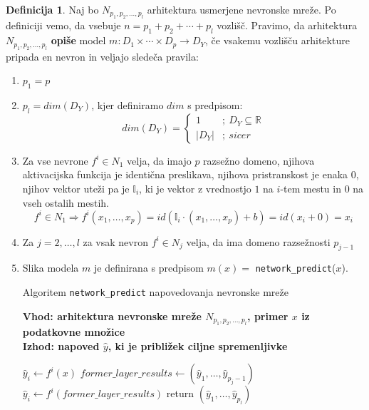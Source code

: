 \documentclass[12pt,a4paper,twoside]{article}
\theoremstyle{definition} %
\newtheorem{definicija}{Definicija}[section]
\theoremstyle{plain} %
\numberwithin{equation}{section}  %
\begin{document}
\begin{definicija}

Naj bo $N_{p_1,p_2,\ldots,p_l}$ arhitektura usmerjene nevronske mreže. Po definiciji vemo, da vsebuje $n= p_1+p_2+\cdots+p_l$ vozlišč. Pravimo, da arhitektura $N_{p_1,p_2,\ldots,p_l}$ \textbf{opiše} model $m: D_1 \times \cdots \times D_p \rightarrow D_Y$, če vsakemu vozlišču arhitekture pripada en nevron in veljajo sledeča pravila:

\begin{enumerate}
  \item $ p_1 = p$

  \item $p_l = dim(D_Y)$, kjer definiramo $dim$ s predpisom:
  \[
	  dim(D_Y) =
	  \begin{cases}
		1 &;\ D_Y \subseteq \mathbb{R} \\
		|D_Y| &;\ sicer
	  \end{cases}	
  \]%

  \item Za vse nevrone $f^i \in N_1$ velja, da imajo $p$ razsežno domeno, njihova aktivacijska funkcija je identična preslikava, njihova pristranskost je enaka $0$, njihov vektor uteži pa je $\mathbb{I}_i$, ki je vektor z vrednostjo $1$ na $i$-tem mestu in $0$ na vseh ostalih mestih.
$$
f^i \in N_1 \Rightarrow f^i(x_1,\ldots,x_p) = id(\mathbb{I}_i \cdot (x_1,\ldots,x_p) + b) = id(x_i+0) = x_i
$$
  \item Za $j=2,\ldots,l$ za vsak nevron $f^i \in N_j$ velja, da ima domeno razsežnosti $p_{j-1}$

  \item Slika modela $m$ je definirana s predpisom $m(x) =$ \texttt{network\_predict}($x$).

  \begin{algorithm}[ht]
    \caption{Algoritem \texttt{network\_predict} napovedovanja nevronske mreže}
    \label{algoritem-neural-predict}
    \raggedright
    \textbf{Vhod: arhitektura nevronske mreže $N_{p_1,p_2,\ldots,p_l}$, primer $x$ iz podatkovne množice}  \\
    \textbf{Izhod: napoved $\hat{y}$, ki je približek ciljne spremenljivke} 
    \begin{algorithmic}[0]
		\State $\hat{y}_i \gets f^i(x)$
	\EndFor
		\State $\mathit{former\_layer\_results} \gets (\hat{y}_1,\ldots,\hat{y}_{p_j-1})$
			\State $\hat{y}_i \gets f^i(\mathit{former\_layer\_results})$
		\EndFor
	\EndFor
	\State return $(\hat{y}_1,\ldots,\hat{y}_{p_l})$
    \end{algorithmic}
  \end{algorithm}


\end{enumerate}
\end{definicija}
\end{document}
